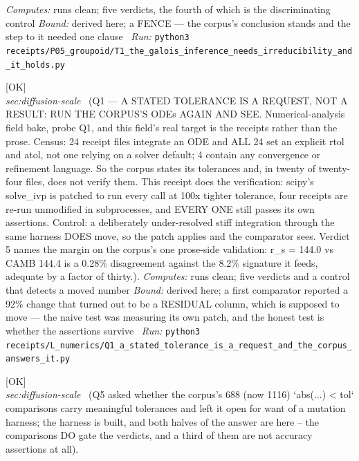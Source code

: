 \begin{description}
\emph{Computes:} runs clean; five verdicts, the fourth of which is the discriminating control
 \emph{Bound:} derived here; a FENCE --- the corpus's conclusion stands and the step to it needed one clause
\ \emph{Run:} \texttt{python3 receipts/P05\_groupoid/T1\_the\_galois\_inference\_needs\_irreducibility\_and\_it\_holds.py}
\item[\label{rcpt:Q1_a_stated_tolerance_is_a_request_and_the_corpus_answers_it}\texttt{Q1\_a\_stated\_tolerance\_is\_a\_request\_and\_the\_corpus\_answers\_it}]\hfill\textsf{[OK]}\\
\textit{sec:diffusion-scale} \ (Q1 --- A STATED TOLERANCE IS A REQUEST, NOT A RESULT: RUN THE CORPUS'S ODEs AGAIN AND SEE. Numerical-analysis field bake, probe Q1, and this field's real target is the receipts rather than the prose. Census: 24 receipt files integrate an ODE and ALL 24 set an explicit rtol and atol, not one relying on a solver default; 4 contain any convergence or refinement language. So the corpus states its tolerances and, in twenty of twenty-four files, does not verify them. This receipt does the verification: scipy's solve\_ivp is patched to run every call at 100x tighter tolerance, four receipts are re-run unmodified in subprocesses, and EVERY ONE still passes its own assertions. Control: a deliberately under-resolved stiff integration through the same harness DOES move, so the patch applies and the comparator sees. Verdict 5 names the margin on the corpus's one prose-side validation: r\_s = 144.0 vs CAMB 144.4 is a 0.28\% disagreement against the 8.2\% signature it feeds, adequate by a factor of thirty.). 
\emph{Computes:} runs clean; five verdicts and a control that detects a moved number
 \emph{Bound:} derived here; a first comparator reported a 92\% change that turned out to be a RESIDUAL column, which is supposed to move --- the naive test was measuring its own patch, and the honest test is whether the assertions survive
\ \emph{Run:} \texttt{python3 receipts/L\_numerics/Q1\_a\_stated\_tolerance\_is\_a\_request\_and\_the\_corpus\_answers\_it.py}
\item[\label{rcpt:Q50_the_tolerance_comparisons_gate_the_verdict_and_a_third_of_them_are_not_tolerances}\texttt{Q50\_the\_tolerance\_comparisons\_gate\_the\_verdict\_and\_a\_third\_of\_them\_are\_not\_tolerances}]\hfill\textsf{[OK]}\\
\textit{sec:diffusion-scale} \ (Q5 asked whether the corpus's 688 (now 1116) `abs(...) < tol` comparisons carry meaningful tolerances and left it open for want of a mutation harness; the harness is built, and both halves of the answer are here -- the comparisons DO gate the verdicts, and a third of them are not accuracy assertions at all). 

\end{description}
